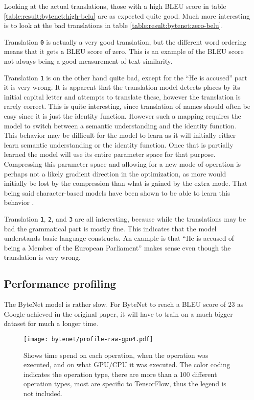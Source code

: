 Looking at the actual translations, those with a high BLEU score in table \ref{table:result:bytenet:high-belu} are as expected quite good. Much more interesting is to look at the bad translations in table \ref{table:result:bytenet:zero-belu}.

Translation \texttt{0} is actually a very good translation, but the different word ordering means that it gets a BLEU score of zero. This is an example of the BLEU score not always being a good measurement of text similarity.

Translation \texttt{1} is on the other hand quite bad, except for the ``He is accused'' part it is very wrong. It is apparent that the translation model detects places by its initial capital letter and attempts to translate these, however the translation is rarely correct. This is quite interesting, since translation of names should often be easy since it is just the identity function. However such a mapping requires the model to switch between a semantic understanding and the identity function. This behavior may be difficult for the model to learn as it will initially either learn semantic understanding or the identity function. Once that is partially learned the model will use its entire parameter space for that purpose. Compressing this parameter space and allowing for a new mode of operation is perhaps not a likely gradient direction in the optimization, as more would initially be lost by the compression than what is gained by the extra mode. That being said character-based models have been shown to be able to learn this behavior \cite{character-alignment}.

Translation \texttt{1}, \texttt{2}, and \texttt{3} are all interesting, because while the translations may be bad the grammatical part is mostly fine. This indicates that the model understands basic language constructs. An example is that ``He is accused of being a Member of the European Parliament'' makes sense even though the translation is very wrong.

\clearpage
\subsection{Performance profiling}
The ByteNet model is rather slow. For ByteNet to reach a BLEU score of 23 as Google achieved in the original paper, it will have to train on a much bigger dataset for much a longer time.

\begin{figure}[h]
    \centering
    \texttt{[image: bytenet/profile-raw-gpu4.pdf]}
    \caption{Shows time spend on each operation, when the operation was executed, and on what GPU/CPU it was executed. The color coding indicates the operation type, there are more than a 100 different operation types, most are specific to TensorFlow, thus the legend is not included.}
    \label{fig:result:bytenet:profile-raw}
\end{figure}


